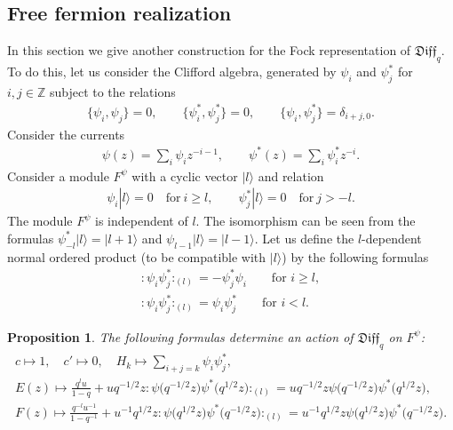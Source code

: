 \documentclass[pdftex]{sigma}
\numberwithin{equation}{section}
\newtheorem{Proposition}[Theorem]{Proposition}
\theoremstyle{definition}
\newcommand{\n}{|l \rangle}
\newcommand{\qD}{\mathfrak{Diff}_q}
\begin{document}
\subsection{Free fermion realization} \label{fermi}

In this section we give another construction for the Fock representation of $\qD$. To do this, let us consider the Clifford algebra, generated by $\psi_i$ and $\psi^*_j$ for $i,j \in \mathbb{Z}$ subject to the relations
\begin{gather*}
\{ \psi_i, \psi_j \} =0, \qquad \{ \psi^*_i, \psi^*_j \} =0, %
\qquad \{ \psi_i , \psi^*_j \} = \delta_{i+j, 0}. %
\end{gather*}
Consider the currents
\begin{gather*}
\psi(z) = \sum_{i} \psi_i z^{-i-1}, \qquad \psi^*(z) = \sum_i \psi^*_i z^{-i}.
\end{gather*}
Consider a module $F^\psi$ with a cyclic vector $\n$ and relation
\begin{gather*}
\psi_i \n = 0 \quad \text{for} \ i \geqslant l, \qquad \psi^*_j \n = 0 \quad \text{for} \ j > -l.
\end{gather*}
The module $F^\psi$ is independent of $l$. The isomorphism can be seen from the formulas $\psi^*_{-l} \n = | l+1 \rangle$ and $\psi_{l-1} \n = | l-1 \rangle$.
Let us define the $l$-dependent normal ordered product (to be compatible with $\n$) by the following formulas
\begin{gather}
: \! \psi_i \psi^*_j \! :_{(l)} = - \psi^*_j \psi_i \qquad \text{for } i \geqslant l, \label{norm1} \\
: \! \psi_i \psi^*_j \! :_{(l)} = \psi_i \psi^*_j \qquad \text{for } i < l. \label{norm2}
\end{gather}

\begin{Proposition} \label{prop: level 1 Fermion}
The following formulas determine an action of $\qD$ on $F^{\psi}$:
\begin{gather}
c \mapsto 1, \quad c' \mapsto 0, \quad H_k \mapsto \sum_{i+j=k} \psi_i \psi_j^*, \label{eq:centerFermi} \\
E(z) \mapsto \frac{q^{l} u }{1-q} + u q^{ - 1/2 }z : \! \psi\big( q^{-1/2} z\big) \psi^* \big( q^{1/2} z\big) \! :_{(l)} = u q^{-1/2} z \psi\big( q^{-1/2} z\big) \psi^* \big( q^{1/2} z\big), \label{ferm:E} \\
F(z) \mapsto \frac{q^{-l} u^{-1} }{1-q^{-1}} + u^{-1} q^{1/2} z : \! \psi\big( q^{1/2} z\big) \psi^* \big(q^{-1/2} z\big)\!:_{(l)}= u^{-1} q^{1/2} z \psi\big( q^{1/2} z\big) \psi^* \big(q^{-1/2} z\big). \!\!\!\label{ferm:F}
\end{gather}
\end{Proposition}
\end{document}
